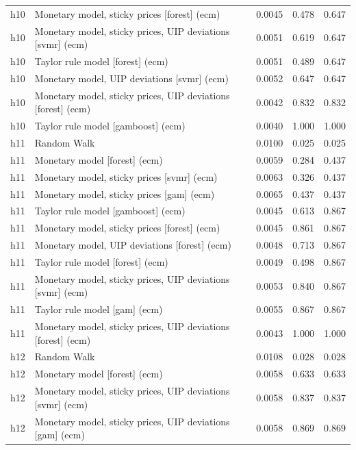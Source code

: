 \begin{ThreePartTable}
\begin{longtable}[t]{cp{5.5cm}ccc}
h10 & \raggedright Monetary model, sticky prices [forest] (ecm) & 0.0045 & 0.478 & 0.647\\
h10 & \raggedright Monetary model, sticky prices, UIP deviations [svmr] (ecm) & 0.0051 & 0.619 & 0.647\\
h10 & \raggedright Taylor rule model [forest] (ecm) & 0.0051 & 0.489 & 0.647\\
h10 & \raggedright Monetary model, UIP deviations [svmr] (ecm) & 0.0052 & 0.647 & 0.647\\
h10 & \raggedright Monetary model, sticky prices, UIP deviations [forest] (ecm) & 0.0042 & 0.832 & 0.832\\
h10 & \raggedright Taylor rule model [gamboost] (ecm) & 0.0040 & 1.000 & 1.000\\
\addlinespace
h11 & \raggedright Random Walk & 0.0100 & 0.025 & 0.025\\
h11 & \raggedright Monetary model [forest] (ecm) & 0.0059 & 0.284 & 0.437\\
h11 & \raggedright Monetary model, sticky prices [svmr] (ecm) & 0.0063 & 0.326 & 0.437\\
h11 & \raggedright Monetary model, sticky prices [gam] (ecm) & 0.0065 & 0.437 & 0.437\\
h11 & \raggedright Taylor rule model [gamboost] (ecm) & 0.0045 & 0.613 & 0.867\\
h11 & \raggedright Monetary model, sticky prices [forest] (ecm) & 0.0045 & 0.861 & 0.867\\
h11 & \raggedright Monetary model, UIP deviations [forest] (ecm) & 0.0048 & 0.713 & 0.867\\
h11 & \raggedright Taylor rule model [forest] (ecm) & 0.0049 & 0.498 & 0.867\\
h11 & \raggedright Monetary model, sticky prices, UIP deviations [svmr] (ecm) & 0.0053 & 0.840 & 0.867\\
h11 & \raggedright Taylor rule model [gam] (ecm) & 0.0055 & 0.867 & 0.867\\
h11 & \raggedright Monetary model, sticky prices, UIP deviations [forest] (ecm) & 0.0043 & 1.000 & 1.000\\
\addlinespace
h12 & \raggedright Random Walk & 0.0108 & 0.028 & 0.028\\
h12 & \raggedright Monetary model [forest] (ecm) & 0.0058 & 0.633 & 0.633\\
h12 & \raggedright Monetary model, sticky prices, UIP deviations [svmr] (ecm) & 0.0058 & 0.837 & 0.837\\
h12 & \raggedright Monetary model, sticky prices, UIP deviations [gam] (ecm) & 0.0058 & 0.869 & 0.869\\

\end{longtable}
\end{ThreePartTable}
